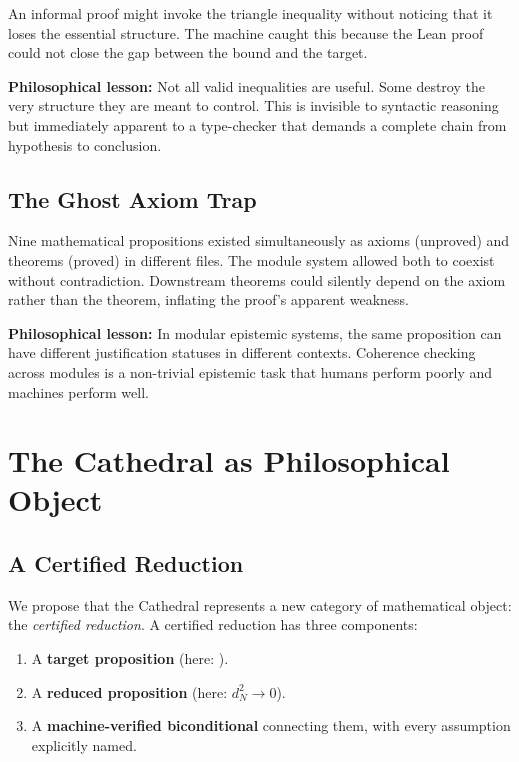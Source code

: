 \documentclass[11pt,a4paper]{article}
\begin{document}
An informal proof might invoke the triangle inequality without
noticing that it loses the essential structure. The machine caught
this because the Lean proof could not close the gap between the
bound and the target.

\textbf{Philosophical lesson:} Not all valid inequalities are useful.
Some destroy the very structure they are meant to control. This is
invisible to syntactic reasoning but immediately apparent to a
type-checker that demands a complete chain from hypothesis to
conclusion.

\subsection{The Ghost Axiom Trap}

Nine mathematical propositions existed simultaneously as axioms
(unproved) and theorems (proved) in different files. The module
system allowed both to coexist without contradiction. Downstream
theorems could silently depend on the axiom rather than the theorem,
inflating the proof's apparent weakness.

\textbf{Philosophical lesson:} In modular epistemic systems, the same
proposition can have different justification statuses in different
contexts. Coherence checking across modules is a non-trivial epistemic
task that humans perform poorly and machines perform well.

\section{The Cathedral as Philosophical Object}
\label{sec:object}

\subsection{A Certified Reduction}

We propose that the Cathedral represents a new category of
mathematical object: the \emph{certified reduction}. A certified
reduction has three components:

\begin{enumerate}
  \item A \textbf{target proposition} (here: \RH).
  \item A \textbf{reduced proposition} (here: $d_N^2 \to 0$).
  \item A \textbf{machine-verified biconditional} connecting them,
    with every assumption explicitly named.
\end{enumerate}
\end{document}
